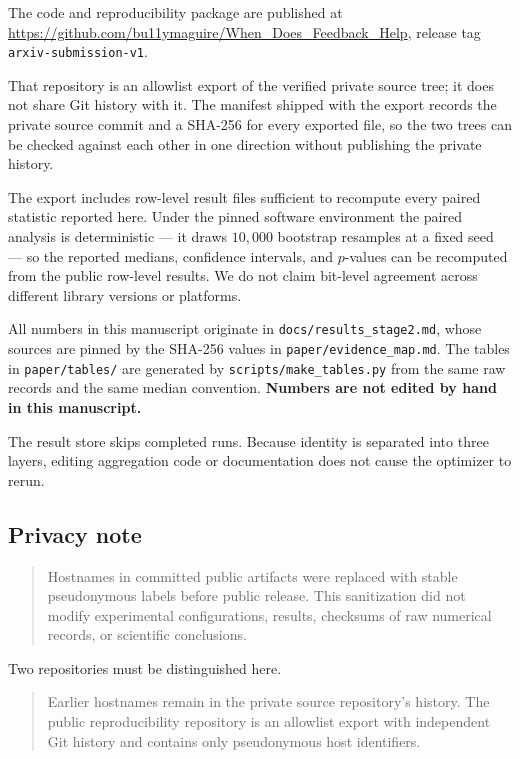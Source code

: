 The code and reproducibility package are published at
\url{https://github.com/bu11ymaguire/When_Does_Feedback_Help}, release tag
\texttt{arxiv-submission-v1}.

That repository is an allowlist export of the verified private source tree; it does not
share Git history with it. The manifest shipped with the export records the private
source commit and a SHA-256 for every exported file, so the two trees can be checked
against each other in one direction without publishing the private history.

The export includes row-level result files sufficient to recompute every paired
statistic reported here. Under the pinned software environment the paired analysis is
deterministic --- it draws $10{,}000$ bootstrap resamples at a fixed seed --- so the
reported medians, confidence intervals, and $p$-values can be recomputed from the
public row-level results. We do not claim bit-level agreement across different
library versions or platforms.

All numbers in this manuscript originate in \texttt{docs/results\_stage2.md}, whose
sources are pinned by the SHA-256 values in \texttt{paper/evidence\_map.md}. The
tables in \texttt{paper/tables/} are generated by
\texttt{scripts/make\_tables.py} from the same raw records and the same median
convention. \textbf{Numbers are not edited by hand in this manuscript.}

The result store skips completed runs. Because identity is separated into three
layers, editing aggregation code or documentation does not cause the optimizer to
rerun.

\subsection*{Privacy note}

\begin{quote}
Hostnames in committed public artifacts were replaced with stable pseudonymous labels
before public release. This sanitization did not modify experimental configurations,
results, checksums of raw numerical records, or scientific conclusions.
\end{quote}

Two repositories must be distinguished here.

\begin{quote}
Earlier hostnames remain in the private source repository's history. The public
reproducibility repository is an allowlist export with independent Git history and
contains only pseudonymous host identifiers.
\end{quote}

